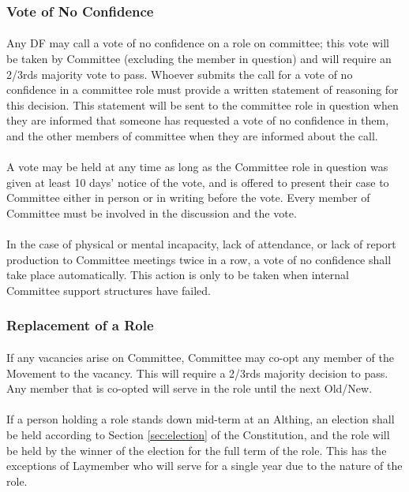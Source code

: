 \documentclass[a4paper, 11pt]{report}
\begin{document}
\subsubsection{Vote of No Confidence}
\label{sec:noconfidence}
\paragraph{} Any DF may call a vote of no confidence on a role on committee; this vote will be taken by Committee (excluding the member in question) and will require an 2/3rds majority vote to pass. Whoever submits the call for a vote of no confidence in a committee role must provide a written statement of reasoning for this decision. This statement will be sent to the committee role in question when they are informed that someone has requested a vote of no confidence in them, and the other members of committee when they are informed about the call.
\paragraph{} A vote may be held at any time as long as the Committee role in question was given at least 10 days’ notice of the vote, and is offered to present their case to Committee either in person or in writing before the vote. Every member of Committee must be involved in the discussion and the vote.
\paragraph{} In the case of physical or mental incapacity, lack of attendance, or lack of report production to Committee meetings twice in a row, a vote of no confidence shall take place automatically. This action is only to be taken when internal Committee support structures have failed.

\subsubsection{Replacement of a Role}
\label{sec:rolereplacement}
\paragraph{} If any vacancies arise on Committee, Committee may co-opt any member of the Movement to the vacancy. This will require a 2/3rds majority decision to pass. Any member that is co-opted will serve in the role until the next Old/New.
\paragraph{} If a person holding a role stands down mid-term at an Althing, an election shall be held according to Section \ref{sec:election} of the Constitution, and the role will be held by the winner of the election for the full term of the role. This has the exceptions of Laymember who will serve for a single year due to the nature of the role.
\end{document}
